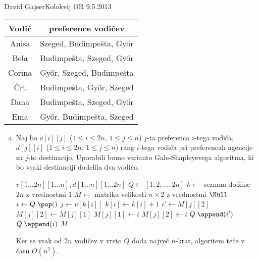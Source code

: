 \begin{naloga}{David Gajser}{Kolokvij OR 9.5.2013}
\begin{vprasanje}
\begin{enumerate}[(a)]
\begin{center}
\bigskip
\begin{tabular}{c|c}
Vodič  & preference vodičev \\ \hline
Anisa  & Szeged, Budimpešta, Győr \\
Bela   & Budimpešta, Szeged, Győr \\
Corina & Győr, Szeged, Budimpešta \\
Črt    & Budimpešta, Győr, Szeged \\
Dana   & Budimpešta, Szeged, Győr \\
Ema    & Győr, Budimpešta, Szeged
\end{tabular}
\end{center}
\end{enumerate}
\end{vprasanje}

\begin{odgovor}
\begin{enumerate}[(a)]
\item
Naj bo $v[i][j]$ ($1 \le i \le 2n$, $1 \le j \le n$)
$j$-ta preferenca $i$-tega vodiča,
$d[j][i]$ ($1 \le i \le 2n$, $1 \le j \le n$)
rang $i$-tega vodiča pri preferencah agencije za $j$-to destinacijo.
Uporabili bomo varianto Gale-Shapleyevega algoritma,
ki bo vsaki destinaciji dodelila dva vodiča.

\begin{small}
\begin{algorithmic}
%
{$v[1 \dots 2n][1 \dots n], d[1 \dots n][1 \dots 2n]$}
    \State $Q \gets [1, 2, \dots, 2n]$
    \State $k \gets$ seznam dolžine $2n$ z vrednostmi $1$
    \State $M \gets$ matrika velikosti $n \times 2$ z vrednostmi $\Null$
        \State $i \gets Q.\pop()$
        \State $j \gets v[k[i]]$
        \State $k[i] \gets k[i] + 1$
        \State $i' \gets M[j][2]$
                \State $M[j][2] \gets M[j][1]$
                \State $M[j][1] \gets i$
            \Else
                \State $M[j][2] \gets i$
            \EndIf
                \State $Q.\append(i')$
            \EndIf
        \Else
            \State $Q.\append(i)$
        \EndIf
    \EndWhile
    \State \Return $M$
\EndFunction
\end{algorithmic}
\end{small}

Ker se vsak od $2n$ vodičev v vrsto $Q$ doda največ $n$-krat,
algoritem teče v času $O(n^2)$.


\end{enumerate}
\end{odgovor}
\end{naloga}

